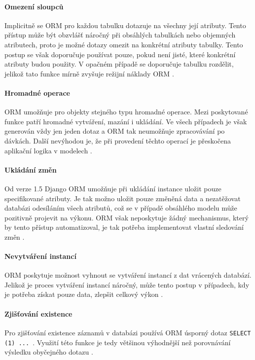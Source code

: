 \documentclass[ing,male,java,dept456]{diploma}						%
\begin{document}
\paragraph{Omezení sloupců}

Implicitně se ORM pro každou tabulku dotazuje na všechny její atributy. Tento přístup může být obzvlášť náročný při obsáhlých tabulkách nebo objemných atributech, proto je možné dotazy omezit na konkrétní atributy tabulky. Tento postup se však doporučuje používat pouze, pokud není jisté, které konkrétní atributy budou použity. V opačném případě se doporučuje tabulku rozdělit, jelikož tato funkce mírně zvyšuje režijní náklady ORM \cite{dj-querysets}. %

\paragraph{Hromadné operace}

ORM umožňuje pro objekty stejného typu hromadné operace. Mezi poskytované funkce patří hromadné vytváření, mazání i ukládání. Ve všech případech je však generován vždy jen jeden dotaz a ORM tak neumožňuje zpracovávání po dávkách. Další nevýhodou je, že při provedení těchto operací je přeskočena aplikační logika v modelech \cite{dj-queries}. %

\paragraph{Ukládání změn} Od verze 1.5 Django ORM umožňuje při ukládání instance uložit pouze specifikované atributy. Je tak možno uložit pouze změněná data a nezatěžovat databázi odesíláním všech atributů, což se v případě obsáhlého modelu může pozitivně projevit na výkonu. ORM však neposkytuje žádný mechanismus, který by tento přístup automatizoval, je tak potřeba implementovat vlastní sledování změn \cite{dj-save}.

\paragraph{Nevytváření instancí} ORM poskytuje možnost vyhnout se vytváření instancí z dat vrácených databází. Jelikož je proces vytváření instancí náročný, může tento postup v případech, kdy je potřeba získat pouze data, zlepšit celkový výkon \cite{dj-querysets}. %

\paragraph{Zjišťování existence} Pro zjišťování existence záznamů v databázi používá ORM úsporný dotaz \lstinline[style=inlinepython]|SELECT (1) ... |. Využití této funkce je tedy většinou výhodnější než porovnávání výsledku obyčejného dotazu \cite{dj-querysets}. %
\end{document}
